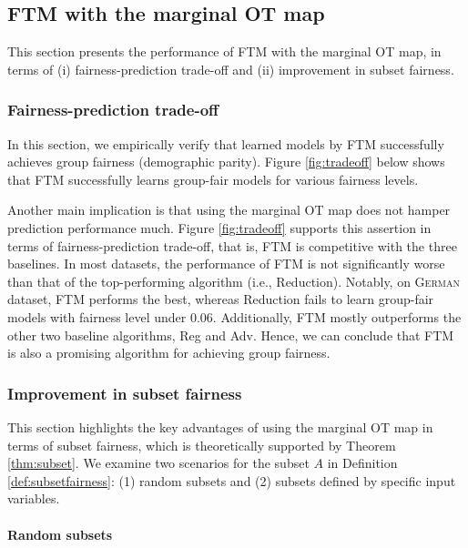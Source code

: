 \documentclass[10pt]{article} %
\begin{document}
\subsection{FTM with the marginal OT map}

This section presents the performance of FTM with the marginal OT map, in terms of (i) fairness-prediction trade-off and (ii) improvement in subset fairness.

\subsubsection{Fairness-prediction trade-off}\label{sec:exp-tradeoff}

In this section, we empirically verify that learned models by FTM successfully achieves group fairness (demographic parity).
Figure \ref{fig:tradeoff} below shows that FTM successfully learns group-fair models for various fairness levels.

Another main implication is that using the marginal OT map does not hamper prediction performance much.
Figure \ref{fig:tradeoff} supports this assertion in terms of fairness-prediction trade-off, that is, FTM is competitive with the three baselines.
In most datasets, the performance of FTM is not significantly worse than that of the top-performing algorithm (i.e., Reduction).
Notably, on \textsc{German} dataset, FTM performs the best, whereas Reduction fails to learn group-fair models with fairness level under 0.06.
Additionally, FTM mostly outperforms the other two baseline algorithms, Reg and Adv.
Hence, we can conclude that FTM is also a promising algorithm for achieving group fairness.

\subsubsection{Improvement in subset fairness}\label{sec:exp-subsets}

This section highlights the key advantages of using the marginal OT map in terms of subset fairness, which is theoretically supported by Theorem \ref{thm:subset}.
We examine two scenarios for the subset $A$ in Definition \ref{def:subsetfairness}:
(1) random subsets and (2) subsets defined by specific input variables.

\paragraph{Random subsets}
\end{document}
